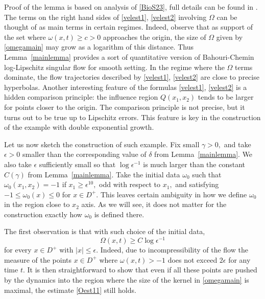 \documentclass[reqno,centertags, 11pt]{amsart}
\newcommand{\be}{\mathbf e} \newcommand{\bh}{\mathbf h}
\newcommand{\lb}{\label}
\renewcommand{\be}{\begin{equation}}
\newcommand{\ee}{\end{equation}}
\begin{document}
Proof of the lemma is based on analysis of \eqref{BioS23}, full details can be found in \cite{KS}.
The terms on the right hand sides of \eqref{velest1}, \eqref{velest2} involving $\Omega$ can be thought of as main
terms in certain regimes. Indeed, observe that as support of the set where $\omega(x,t)\geq c>0$ approaches the origin,
the size of $\Omega$ given by \eqref{omegamain} may grow as a logarithm of this distance. Thus Lemma~\ref{mainlemma}
provides a sort of quantitative version of Bahouri-Chemin log-Lipschitz singular flow for smooth setting.
In the regime where the $\Omega$ terms dominate, the flow trajectories described by \eqref{velest1}, \eqref{velest2} are
close to precise hyperbolas. Another interesting feature of the formulas \eqref{velest1}, \eqref{velest2} is a hidden
comparison principle: the influence region $Q(x_1,x_2)$ tends to be larger for points closer to the origin.
The comparison principle is not precise, but it turns out to be true up to Lipschitz errors. This feature is key
in the construction of the example with double exponential growth.

Let us now sketch the construction of such example. Fix small $\gamma>0,$ and take $\epsilon>0$ smaller than the corresponding
value of $\delta$ from Lemma~\ref{mainlemma}. We also take $\epsilon$ sufficiently small so that $\log \epsilon^{-1}$ is much
larger than the constant $C(\gamma)$ from Lemma~\ref{mainlemma}. %
Take the initial data $\omega_0$ such that $\omega_0(x_1,x_2) =-1$ if $x_1 \geq \epsilon^{10},$
odd with respect to $x_1,$ and satisfying $-1 \leq \omega_0(x) \leq 0$ for $x \in D^+.$ This leaves certain ambiguity in how
we define $\omega_0$ in the region close to $x_2$ axis. As we will see, it does not matter for the construction exactly how $\omega_0$ is defined
there.

The first observation is that with such choice of the initial data,
\be\lb{Oest11}
\Omega(x,t) \geq C\log \epsilon^{-1}\ee for every $x \in D^+$
with $|x| \leq \epsilon.$ Indeed, due to incompressibility of the flow the measure of the points $x \in D^+$ where $\omega(x,t) >-1$
does not exceed $2\epsilon$ for any time $t.$ It is then straightforward to show that even if all these points
are pushed by the dynamics into the region where the size of the kernel in \eqref{omegamain} is maximal, the estimate \eqref{Oest11}
still holds.
\end{document}

